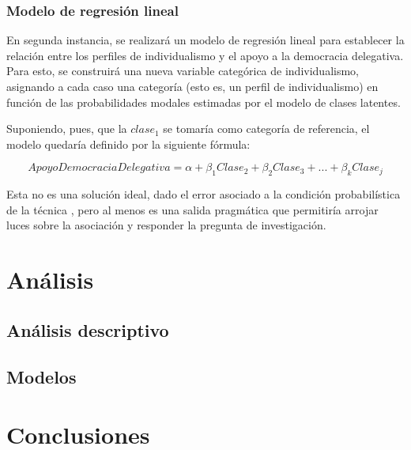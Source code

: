 \documentclass[12pt,twoside]{templates/facsothesis}
\begin{document}
\hypertarget{modelo-de-regresiuxf3n-lineal}{%
\subsection{Modelo de regresión lineal}\label{modelo-de-regresiuxf3n-lineal}}

En segunda instancia, se realizará un modelo de regresión lineal para establecer la relación entre los perfiles de individualismo y el apoyo a la democracia delegativa. Para esto, se construirá una nueva variable categórica de individualismo, asignando a cada caso una categoría (esto es, un perfil de individualismo) en función de las probabilidades modales estimadas por el modelo de clases latentes.

Suponiendo, pues, que la \(clase_1\) se tomaría como categoría de referencia, el modelo quedaría definido por la siguiente fórmula:

\[Apoyo Democracia Delegativa = \alpha + \beta_1Clase_2 + \beta_2Clase_3 + ... + \beta_kClase_j \]

Esta no es una solución ideal, dado el error asociado a la condición probabilística de la técnica \citep{collins2010}, pero al menos es una salida pragmática que permitiría arrojar luces sobre la asociación y responder la pregunta de investigación.

\hypertarget{anuxe1lisis}{%
\chapter{Análisis}\label{anuxe1lisis}}

\hypertarget{anuxe1lisis-descriptivo}{%
\section{Análisis descriptivo}\label{anuxe1lisis-descriptivo}}

\hypertarget{modelos}{%
\section{Modelos}\label{modelos}}

\hypertarget{conclusiones}{%
\chapter{Conclusiones}\label{conclusiones}}


\cleardoublepage
\pagestyle{fancyplain}
\fancyhf{}
{}


\end{document}
